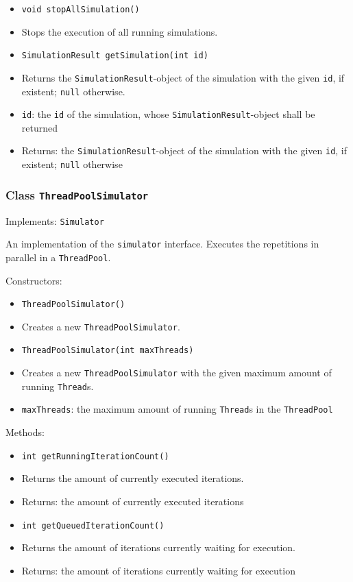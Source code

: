 \documentclass[parskip=full,11pt]{scrartcl}
\begin{document}
\begin{itemize}
	\item \texttt{void stopAllSimulation()}
	\item[] Stops the execution of all running simulations.
	
	\item \texttt{SimulationResult getSimulation(int id)}
	\item[] Returns the \texttt{SimulationResult}-object of the simulation with the given \texttt{id}, if existent; \texttt{null} otherwise.
	\item[] \texttt{id}: the \texttt{id} of the simulation, whose \texttt{SimulationResult}-object shall be returned
	\item[] Returns: the \texttt{SimulationResult}-object of the simulation with the given \texttt{id}, if existent; \texttt{null} otherwise
\end{itemize}

\subsubsection{Class \texttt{ThreadPoolSimulator}}
Implements: \texttt{Simulator}

An implementation of the \texttt{simulator} interface. Executes the repetitions in parallel in a \texttt{ThreadPool}.

Constructors:
\begin{itemize}\itemsep -10pt
\item \texttt{ThreadPoolSimulator()}
\item[] Creates a new \texttt{ThreadPoolSimulator}.

\item \texttt{ThreadPoolSimulator(int maxThreads)}
\item[] Creates a new \texttt{ThreadPoolSimulator} with the given maximum amount of running \texttt{Thread}s.
\item[] \texttt{maxThreads}: the maximum amount of running \texttt{Thread}s in the \texttt{ThreadPool}
\end{itemize}

Methods:
\begin{itemize}\itemsep -10pt
\item \texttt{int getRunningIterationCount()}
\item[] Returns the amount of currently executed iterations.
\item[] Returns: the amount of currently executed iterations

\item \texttt{int getQueuedIterationCount()}
\item[] Returns the amount of iterations currently waiting for execution.
\item[] Returns: the amount of iterations currently waiting for execution
\end{itemize}
\end{document}
